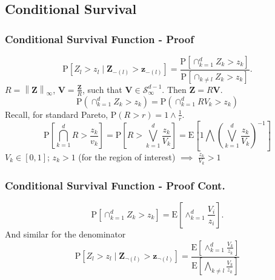 \documentclass[aspectratio=169]{beamer}
\newcommand{\norm}[1]{\left\lVert #1 \right\rVert}
\newcommand{\pnorm}[2]{\norm{#1}_{#2}}
\begin{document}
\subsection*{Conditional Survival}

\begin{frame}
  \frametitle{Conditional Survival Function - Proof}
  {\small
  \begin{equation*}
    \label{eqn:condsurv1d}
    \text{P}\left[Z_l > z_l\mid \bm{Z}_{-(l)} > \bm{z}_{-(l)}\right] =
      \frac{\text{P}\left[\cap_{k = 1}^d Z_k > z_k\right]}{\text{P}\left[\cap_{k \neq l} Z_k > z_k\right]}.
  \end{equation*}
  \pause
  $R = \pnorm{\bm{Z}}{\infty}$, $\bm{V} = \frac{\bm{Z}}{R}$, such that
    $\bm{V}\in \mathcal{S}_{\infty}^{d-1}$.  Then $\bm{Z} = R\bm{V}$.
  \begin{equation*}
    \text{P}\left(\cap_{k = 1}^d Z_k > z_k\right) = \text{P}\left(\cap_{k = 1}^d RV_k > z_k\right)
  \end{equation*}
  \pause
  Recall, for standard Pareto, $\text{P}(R > r) = 1\wedge\frac{1}{r}$.
  \begin{equation*}
    \text{P}\left[\bigcap_{k = 1}^d R > \frac{z_k}{v_k}\right] =
      \text{P}\left[R  > \bigvee_{k=1}^d\frac{z_k}{V_k}\right] =
      \text{E}\left[1 \bigwedge \left(\bigvee_{k = 1}^d\frac{z_k}{V_k}\right)^{-1}\right]
  \end{equation*}
  $V_k \in [0,1]$; $z_k > 1$ (for the region of interest) $\implies$ $\frac{z_k}{V_k} > 1$
  }
\end{frame}

\begin{frame}
    \frametitle{Conditional Survival Function - Proof Cont.}
    {\small 
  \begin{equation*}
    \text{P}\left[\cap_{k = 1}^d Z_k > z_k\right] = \text{E}\left[\wedge_{k = 1}^d\frac{V_i}{z_i}\right].
  \end{equation*}
  \pause
  And similar for the denominator
  \begin{equation*}
    \text{P}\left[Z_l > z_l\mid \bm{Z}_{\neg(l)} > \bm{z}_{\neg(l)}\right] =
      \frac{\text{E}\left[\wedge_{k = 1}^d \frac{V_k}{z_k}\right]}{\text{E}\left[
                \bigwedge_{k \neq l}\frac{V_k}{z_k}\right]}
  \end{equation*}
  }
\end{frame}
\end{document}
